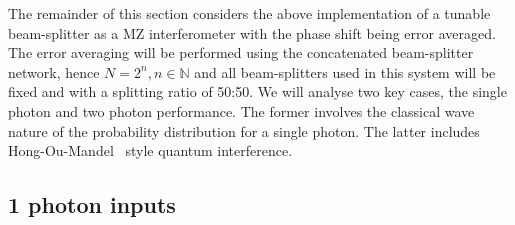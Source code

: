 \documentclass[aps,pra,twocolumn,superscriptaddress,numerical,floatfix]{revtex4-1}
\begin{document}

The remainder of this section considers the above implementation of a tunable beam-splitter as a MZ interferometer with the phase shift being error averaged. The error averaging will be performed using the concatenated beam-splitter network, hence $N=2^n, n \in \mathbb{N}$ and all beam-splitters used in this system will be fixed and with a splitting ratio of 50:50. We will analyse two key cases, the single photon and two photon performance.  The former involves the classical wave nature of the probability distribution for a single photon.  The latter includes Hong-Ou-Mandel~\cite{hom} style quantum interference.

\subsection{1 photon inputs \label{1 photon N arbitrary}}
\end{document}
